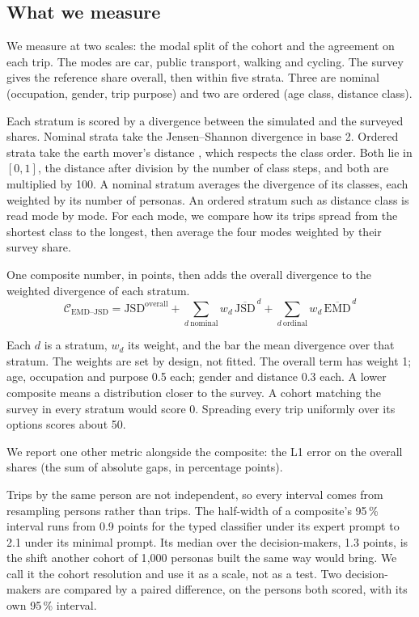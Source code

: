 \subsection{What we measure}
\label{sec:quantities}

We measure at two scales: the modal split of the cohort and the agreement on each trip. The
modes are car, public transport, walking and cycling. The survey gives the reference share
overall, then within five strata. Three are nominal (occupation, gender, trip purpose) and
two are ordered (age class, distance class).

Each stratum is scored by a divergence between the simulated and the surveyed shares. Nominal
strata take the Jensen--Shannon divergence \citep{lin1991divergence} in base 2. Ordered strata
take the earth mover's distance \citep{rubner2000earth}, which respects the class order. Both
lie in $[0, 1]$, the distance after division by the number of class steps, and both are
multiplied by 100. A nominal stratum averages the divergence of its classes, each weighted by
its number of personas. An ordered stratum such as distance class is read mode by mode. For
each mode, we compare how its trips spread from the shortest class to the longest, then
average the four modes weighted by their survey share.

One composite number, in points, then adds the overall divergence to the weighted divergence
of each stratum.
\[
  \mathcal{C}_{\text{EMD--JSD}} = \mathrm{JSD}^{\text{overall}}
  + \sum_{d\ \text{nominal}} w_d\,\overline{\mathrm{JSD}}^{\,d}
  + \sum_{d\ \text{ordinal}} w_d\,\overline{\mathrm{EMD}}^{\,d}
\]

Each $d$ is a stratum, $w_d$ its weight, and the bar the mean divergence over that stratum.
The weights are set by design, not fitted. The overall term has weight 1; age, occupation and
purpose 0.5 each; gender and distance 0.3 each. A lower composite means a distribution closer
to the survey. A cohort matching the survey in every stratum would score 0. Spreading every
trip uniformly over its options scores about 50.

We report one other metric alongside the composite: the L1 error on the overall shares
(the sum of absolute gaps, in percentage points).

Trips by the same person are not independent, so every interval comes from resampling
persons rather than trips. The half-width of a composite's 95\,\% interval runs from 0.9
points for the typed classifier under its expert prompt to 2.1 under its minimal prompt. Its
median over the decision-makers, 1.3 points, is the shift another cohort of 1{,}000 personas
built the same way would bring. We call it the cohort resolution and use it as a scale, not
as a test. Two decision-makers are compared by a paired difference, on the persons both
scored, with its own 95\,\% interval.

